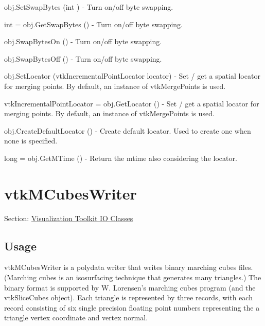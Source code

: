 \begin{DoxyItemize}
\item {\ttfamily obj.\-Set\-Swap\-Bytes (int )} -\/ Turn on/off byte swapping.  
\item {\ttfamily int = obj.\-Get\-Swap\-Bytes ()} -\/ Turn on/off byte swapping.  
\item {\ttfamily obj.\-Swap\-Bytes\-On ()} -\/ Turn on/off byte swapping.  
\item {\ttfamily obj.\-Swap\-Bytes\-Off ()} -\/ Turn on/off byte swapping.  
\item {\ttfamily obj.\-Set\-Locator (vtk\-Incremental\-Point\-Locator locator)} -\/ Set / get a spatial locator for merging points. By default, an instance of vtk\-Merge\-Points is used.  
\item {\ttfamily vtk\-Incremental\-Point\-Locator = obj.\-Get\-Locator ()} -\/ Set / get a spatial locator for merging points. By default, an instance of vtk\-Merge\-Points is used.  
\item {\ttfamily obj.\-Create\-Default\-Locator ()} -\/ Create default locator. Used to create one when none is specified.  
\item {\ttfamily long = obj.\-Get\-M\-Time ()} -\/ Return the mtime also considering the locator.  
\end{DoxyItemize}\hypertarget{vtkio_vtkmcubeswriter}{}\section{vtk\-M\-Cubes\-Writer}\label{vtkio_vtkmcubeswriter}
Section\-: \hyperlink{sec_vtkio}{Visualization Toolkit I\-O Classes} \hypertarget{vtkwidgets_vtkxyplotwidget_Usage}{}\subsection{Usage}\label{vtkwidgets_vtkxyplotwidget_Usage}
vtk\-M\-Cubes\-Writer is a polydata writer that writes binary marching cubes files. (Marching cubes is an isosurfacing technique that generates many triangles.) The binary format is supported by W. Lorensen's marching cubes program (and the vtk\-Slice\-Cubes object). Each triangle is represented by three records, with each record consisting of six single precision floating point numbers representing the a triangle vertex coordinate and vertex normal.

